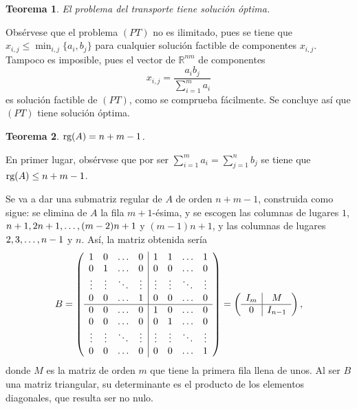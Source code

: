 \documentclass[11pt]{report}
\makeatletter
\renewenvironment{proof}[1][\proofname]{\par
  \pushQED{\qed}%
  \normalfont \topsep\z@skip %
  \trivlist
  \item[\hskip\labelsep
        \itshape
    #1\@addpunct{.}]\ignorespaces
}{%
  \popQED\endtrivlist\@endpefalse
}
\theoremstyle{mytheorem}
\newtheorem{theorem}{Teorema}
\theoremstyle{mydefinition}
\theoremstyle{myexample}
\let\oldproofname=\proofname
\renewcommand{\proofname}{\rm\bf{\oldproofname}}}
\newenvironment{ctheorem} %
  {\begin{mdframed}[
        linewidth=3pt,
        linecolor=c2,
        bottomline=false,
        topline=false,
        rightline=false,
        innerrightmargin=0pt,
        innertopmargin=0pt,
        innerbottommargin=0pt,
        innerleftmargin=1em,
        skipabove=\baselineskip]
    \begin{theorem}}
  {\end{theorem}\end{mdframed}}
\newcommand{\R}{\mathbb R}
\makeatother
\begin{document}
\begin{ctheorem}
    El problema del transporte tiene solución óptima.
\end{ctheorem}

\begin{proof}
Obsérvese que el problema $(PT)$ no es ilimitado, pues se tiene que $x_{i,j} \leq \min_{i,j}\{a_i,b_j\}$ para cualquier solución factible de componentes $x_{i,j}$. Tampoco es imposible, pues el vector de $\R^{nm}$ de componentes
\[x_{i,j} = \frac{a_ib_j}{\sum_{i=1}^m a_i}\]
es solución factible de $(PT)$, como se comprueba fácilmente. Se concluye así  que $(PT)$ tiene solución óptima.
\end{proof}

\begin{ctheorem}
$\textup{rg}(A) = n+m-1$.
\end{ctheorem}

\begin{proof}
En primer lugar, obsérvese que por ser $\sum_{i=1}^ma_i = \sum_{j=1}^nb_j$ se tiene que $\textup{rg}(A) \leq n+m-1$. 



Se va a dar una submatriz regular de $A$ de orden $n+m-1$, construida como sigue: se elimina de $A$ la fila $m+1$-ésima, y se escogen las columnas de lugares $1$, $n+1,2n+1,\mathellipsis,(m-2)n+1$ y $(m-1)n+1$, y las columnas de lugares $2,3,\mathellipsis,n-1$ y $n$. Así, la matriz obtenida sería
\[B = \left(\begin{array}{cccc|cccc}
     1 & 0 & \mathellipsis & 0 & 1 & 1 & \mathellipsis & 1 \\
     0 & 1 & \mathellipsis & 0 & 0 & 0 & \mathellipsis & 0 \\
     \vdots & \vdots & \ddots & \vdots & \vdots & \vdots & \ddots & \vdots \\
     0 & 0 & \mathellipsis & 1 & 0 & 0 & \mathellipsis & 0 \\ \hline
     0 & 0 & \mathellipsis & 0 & 1 & 0 & \mathellipsis & 0 \\
     0 & 0 & \mathellipsis & 0 & 0 & 1 & \mathellipsis & 0 \\
     \vdots & \vdots & \ddots & \vdots & \vdots & \vdots & \ddots & \vdots \\
     0 & 0 & \mathellipsis & 0 & 0 & 0 & \mathellipsis & 1 \\
\end{array}\right) = \left(\begin{array}{c|c}
    I_m & M \\ \hline
    0 & I_{n-1} 
\end{array}\right),\]
donde $M$ es la matriz de orden $m$ que tiene la primera fila llena de unos. Al ser $B$ una matriz triangular, su determinante es el producto de los elementos diagonales, que resulta ser no nulo.
\end{proof}
\end{document}
